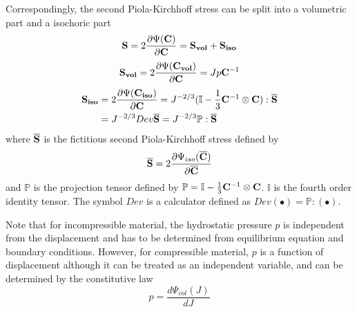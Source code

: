 Correspondingly, the second Piola-Kirchhoff stress can be split into a volumetric part and a isochoric part
\begin{equation} \label{S}
\bold{S} =  2\frac{\partial{\Psi({\bold{C})}}}{\partial{\bold{C}}} = \bold{S_{vol}}  + \bold{S_{iso}} 
\end{equation}
\begin{equation} \label{Svol}
\bold{S_{vol}} = 2\frac{\partial{\Psi({\bold{C_{vol}})}}}{\partial{\bold{C}}} = Jp{\bold{C}} ^{-1}
\end{equation}
\begin{equation} \label{Siso}
\begin{split}
\bold{S_{iso}} & = 2\frac{\partial{\Psi({\bold{C_{iso}})}}}{\partial{\bold{C}}} = J^{-2/3}(\mathbb{I} - \frac{1}{3}\bold{C}^{-1} \otimes \bold{C}):\overline{\bold{S}} \\
&  = J^{-2/3}Dev\overline{\bold{S}} = J^{-2/3}\mathbb{P}:\overline{\bold{S}}
\end{split}
\end{equation}
where  $\overline{\bold{S}}$ is the fictitious second Piola-Kirchhoff stress defined by
\begin{equation} \label{fictitious}
\overline{\bold{S}} = 2\frac{\partial\Psi_{iso}({\overline{\bold{C}})}}{\partial\overline{\bold{C}}}
\end{equation}
and $\mathbb{P}$ is the projection tensor defined by $\mathbb{P} = \mathbb{I} - \frac{1}{3}\bold{C}^{-1} \otimes \bold{C} $. $\mathbb{I}$ is the fourth order identity tensor. The symbol $Dev$ is a calculator defined as $Dev(\bullet) = \mathbb{P}:(\bullet)$.

Note that for incompressible material, the hydrostatic pressure $p$ is independent from the displacement and has to be determined from equilibrium equation and boundary conditions. However, for compressible material,  $p$ is a function of displacement although it can be treated as an independent variable, and can be determined by the constitutive law
\begin{equation}
p = \frac{d\Psi_{vol}(J)}{dJ}
\end{equation}
%
